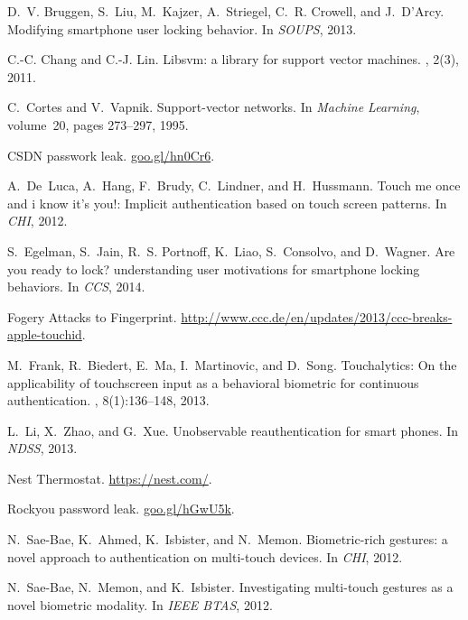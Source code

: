 \documentclass{sig-alternate-05-2015}
\begin{document}
{{\begin{thebibliography}{10}
D.~V. Bruggen, S.~Liu, M.~Kajzer, A.~Striegel, C.~R. Crowell, and J.~D'Arcy.
\newblock Modifying smartphone user locking behavior.
\newblock In {\em SOUPS}, 2013.

C.-C. Chang and C.-J. Lin.
\newblock Libsvm: a library for support vector machines.
, 2(3), 2011.

C.~Cortes and V.~Vapnik.
\newblock Support-vector networks.
\newblock In {\em Machine Learning}, volume~20, pages 273--297, 1995.

{CSDN passwork leak}.
\newblock \url{goo.gl/hn0Cr6}.

A.~De~Luca, A.~Hang, F.~Brudy, C.~Lindner, and H.~Hussmann.
\newblock Touch me once and i know it's you!: Implicit authentication based on
  touch screen patterns.
\newblock In {\em CHI}, 2012.

S.~Egelman, S.~Jain, R.~S. Portnoff, K.~Liao, S.~Consolvo, and D.~Wagner.
\newblock Are you ready to lock? understanding user motivations for smartphone
  locking behaviors.
\newblock In {\em CCS}, 2014.

{Fogery Attacks to Fingerprint}.
\newblock \url{http://www.ccc.de/en/updates/2013/ccc-breaks-apple-touchid}.

M.~Frank, R.~Biedert, E.~Ma, I.~Martinovic, and D.~Song.
\newblock Touchalytics: On the applicability of touchscreen input as a
  behavioral biometric for continuous authentication.
,
  8(1):136--148, 2013.

L.~Li, X.~Zhao, and G.~Xue.
\newblock Unobservable reauthentication for smart phones.
\newblock In {\em NDSS}, 2013.

{Nest Thermostat}.
\newblock \url{https://nest.com/}.

{Rockyou password leak}.
\newblock \url{goo.gl/hGwU5k}.

N.~Sae-Bae, K.~Ahmed, K.~Isbister, and N.~Memon.
\newblock Biometric-rich gestures: a novel approach to authentication on
  multi-touch devices.
\newblock In {\em CHI}, 2012.

N.~Sae-Bae, N.~Memon, and K.~Isbister.
\newblock Investigating multi-touch gestures as a novel biometric modality.
\newblock In {\em IEEE BTAS}, 2012.


\end{thebibliography}}}
\end{document}
